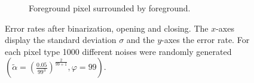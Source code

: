 \begin{figure}[H]
\begin{subfigure}[t]{0.48\linewidth}
		\caption{Foreground pixel surrounded by foreground.}
		\label{fig: relaxed_alpha0.05_phi99_foreground_free}
	\end{subfigure}
	\caption{Error rates after binarization, opening and closing. The $x$-axes display the standard deviation $\sigma$ and the $y$-axes the error rate. For each pixel type 1000 different noises were randomly generated $\left( \tilde{\alpha} = \left( \frac{0.05}{99^3} \right)^{\frac{2}{99 + 1}}, \varphi = 99 \right)$.}
	\label{fig: relaxed_alpha0.05_phi99}
\end{figure}